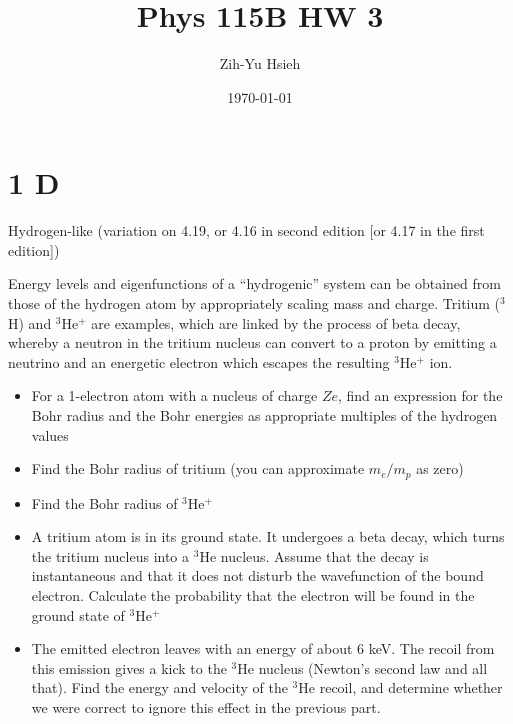 \documentclass{article}
\title{Phys 115B HW 3}
\author{Zih-Yu Hsieh}
\date{\today}
\begin{document}
\maketitle

\section*{1 D}
\begin{ques}\label{q1}
Hydrogen-like (variation on 4.19, or 4.16 in second edition [or 4.17 in the first edition])

Energy levels and eigenfunctions of a “hydrogenic” system can be obtained from those of the hydrogen atom by appropriately scaling mass and charge. Tritium ($^3$H) and $^3$He$^+$ are examples, which are linked by the process of beta decay, whereby a neutron in the tritium nucleus can convert to a proton by emitting a neutrino and an energetic electron which escapes the resulting $^3$He$^+$ ion.
\begin{itemize}
\item[(a)] For a 1-electron atom with a nucleus of charge $Ze$, find an expression for the Bohr radius and the Bohr energies as appropriate multiples of the hydrogen values

\item[(b)] Find the Bohr radius of tritium (you can approximate $m_e/m_p$ as zero)

\item[(c)] Find the Bohr radius of $^3$He$^+$

\item[(d)] A tritium atom is in its ground state. It undergoes a beta decay, which turns the tritium nucleus into a $^3$He nucleus. Assume that the decay is instantaneous and that it does not disturb the wavefunction of the bound electron. Calculate the probability that the electron will be found in the ground state of $^3$He$^+$

\item[(e)] The emitted electron leaves with an energy of about 6 keV. The recoil from this emission gives a kick to the $^3$He nucleus (Newton’s second law and all that). Find the energy and velocity of the $^3$He recoil, and determine whether we were correct to ignore this effect in the previous part.
\end{itemize}
\end{ques}
\end{document}
